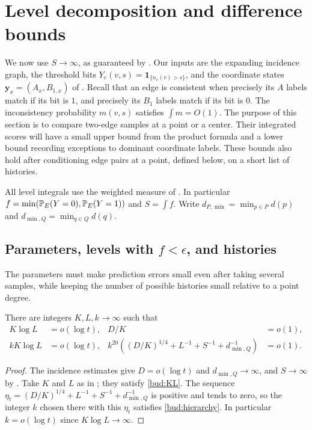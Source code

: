 \section{Level decomposition and difference bounds}\label{sec:budgets}

We now use $S\to\infty$, as guaranteed by
.  Our inputs are the expanding incidence graph, the
threshold bits $Y_e(v,s)=\mathbf1_{\{n_e(v)>s\}}$, and the coordinate
states $\mathbf y_x=(A_x,B_{1,x})$ of .  Recall that an edge is
consistent when precisely its $A$ labels match if its bit is $1$, and
precisely its $B_1$ labels match if its bit is $0$.  The inconsistency
probability $m(v,s)$ satisfies $\int m=O(1)$.
The purpose of this section is to compare two-edge samples at a point or
a center.  Their integrated scores will have a small upper bound from
the product formula and a lower bound recording exceptions to dominant
coordinate labels.  These bounds also hold after conditioning edge pairs at a point, defined below, on a short list of histories.

All level integrals use the weighted measure of .
In particular $f=\min(\mathbb P_E(Y=0),\mathbb P_E(Y=1))$ and $S=\int f$.
Write $d_{P,\min}=\min_{p\in P}d(p)$ and
$d_{\min,Q}=\min_{q\in Q}d(q)$.

\subsection{\texorpdfstring{Parameters, levels with $f<\epsilon$, and histories}{Parameters, levels with f<epsilon, and histories}}

The parameters must make prediction errors small even after taking
several samples, while keeping the number of possible histories small
relative to a point degree.

\begin{lemma}\label{bud:parameters}
There are integers $K,L,k\to\infty$ such that
\begin{align}
 K\log L&=o(\log t),& D/K&=o(1),\label{bud:KL}\\
 kK\log L&=o(\log t),&
 k^{20}\left((D/K)^{1/4}+L^{-1}+S^{-1}+d_{\min,Q}^{-1}\right)&=o(1).
 \label{bud:hierarchy}
\end{align}
\end{lemma}

\begin{proof}
The incidence estimates give $D=o(\log t)$ and $d_{\min,Q}\to\infty$,
and $S\to\infty$ by .  Take $K$ and $L$ as in
; they satisfy \eqref{bud:KL}.  The sequence
$\eta_t=(D/K)^{1/4}+L^{-1}+S^{-1}+d_{\min,Q}^{-1}$ is positive and tends
to zero, so the integer $k$ chosen there with this $\eta_t$ satisfies
\eqref{bud:hierarchy}.  In particular $k=o(\log t)$ since $K\log L\to\infty$.
\end{proof}

